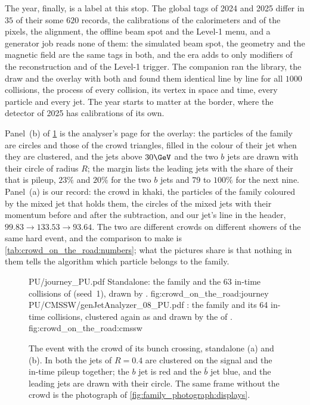 The year, finally, is a label at this stop. The global tags of 2024 and
2025 differ in $35$ of their some $620$ records, the calibrations of the
calorimeters and of the pixels, the alignment, the offline beam spot and
the Level-1 menu, and a generator job reads none of them: the simulated
beam spot, the geometry and the magnetic field are the same tags in both,
and the era  adds to  only modifiers of
the reconstruction and of the Level-1 trigger. The companion ran the
library, the draw and the overlay with both and found them identical line
by line for all $1000$ collisions,
the process of every collision, its vertex in space and time, every
particle and every jet. The year starts to matter at the border, where
the detector of 2025 has calibrations of its own.

Panel~(b) of \cref{fig:crowd_on_the_road:displays} is the analyser's page
for the overlay: the particles of the family are circles and those of the
crowd triangles, filled in the colour of their jet when they are
clustered, and the jets above $30\GeV$ and the two $b$ jets are drawn with
their circle of radius $R$; the margin lists the leading jets with the
share of their \pt that is pileup, $23\%$ and $20\%$ for the two $b$ jets
and $79$ to $100\%$ for the next nine. Panel~(a) is our record: the crowd
in khaki, the particles of the family coloured by the mixed jet that holds
them, the circles of the mixed jets with their momentum before and after
the subtraction, and our jet's line in the header,
$99.83\to133.53\to93.64$. The two are different crowds on different
showers of the same hard event, and the comparison to make is
\cref{tab:crowd_on_the_road:numbers}; what the pictures share is that
nothing in them tells the algorithm which particle belongs to the family.

\begin{figure}[p]\centering
\ledgerdisplays
  {PU/journey_PU.pdf}
  {Standalone: the family and the 63 in-time collisions of  (seed~1), drawn by .}
  {fig:crowd_on_the_road:journey}
  {PU/CMSSW/genJetAnalyzer_08_PU.pdf}
  {\CMSSW: the family and its 64 in-time collisions, clustered again as  and drawn by the  of .}
  {fig:crowd_on_the_road:cmssw}
\caption[The event with the crowd in the $(\eta,\phi)$ plane, standalone
and \CMSSW]{The event with the crowd of its bunch crossing, standalone (a)
and \CMSSW (b). In both the \antikt jets of $R=0.4$ are clustered on the
signal and the in-time pileup together; the $b$ jet is red and the $\bar b$
jet blue, and the leading jets are drawn with their circle. The same frame
without the crowd is the photograph of
\cref{fig:family_photograph:displays}.}
\label{fig:crowd_on_the_road:displays}
\end{figure}

